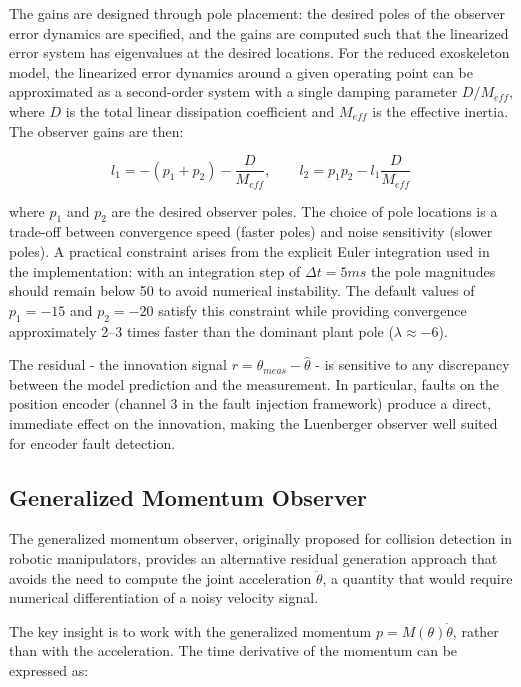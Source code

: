 The gains are designed through pole placement: the desired poles of the observer error dynamics are specified, and the gains are computed such that the linearized error system has eigenvalues at the desired locations. For the reduced exoskeleton model, the linearized error dynamics around a given operating point can be approximated as a second-order system with a single damping parameter $D/M_{eff}$, where $D$ is the total linear dissipation coefficient and $M_{eff}$ is the effective inertia. The observer gains are then:

\begin{equation}
    l_1 = - (p_1 + p_2) - \frac{D}{M_{eff}}, \qquad l_2 = p_1 p_2 - l_1 \frac{D}{M_{eff}}
\end{equation}

where $p_1$ and $p_2$ are the desired observer poles. The choice of pole locations is a trade-off between convergence speed (faster poles) and noise sensitivity (slower poles). A practical constraint arises from the explicit Euler integration used in the implementation: with an integration step of $\Delta t = 5ms$ the pole magnitudes should remain below  50 to avoid numerical instability. The default values of $p_1 = -15$ and $p_2 = -20$ satisfy this constraint while providing convergence approximately 2–3 times faster than the dominant plant pole ($\lambda \approx -6$).

The residual - the innovation signal $r = \theta_{meas} - \hat{\theta}$ - is sensitive to any discrepancy between the model prediction and the measurement. In particular, faults on the position encoder (channel 3 in the fault injection framework) produce a direct, immediate effect on the innovation, making the Luenberger observer well suited for encoder fault detection.

\subsection{Generalized Momentum Observer}
The generalized momentum observer\cite{GMO_FaultDetection}, originally proposed for collision detection in robotic manipulators, provides an alternative residual generation approach that avoids the need to compute the joint acceleration $\ddot{\theta}$, a quantity that would require numerical differentiation of a noisy velocity signal.

The key insight is to work with the generalized momentum $p = M(\theta) \dot{\theta}$, rather than with the acceleration. The time derivative of the momentum can be expressed as:

